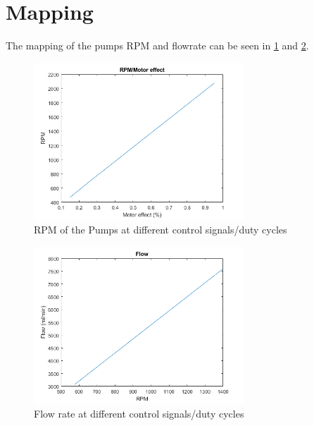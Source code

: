  
 



 













\section{Mapping}
The mapping of the pumps RPM and flowrate can be seen in \ref{fig:RPM} and \ref{fig:Flowrate}.
\begin{figure}[h]
    \centering
    \includegraphics[width=0.7\textwidth]{RPM.png}
    \caption{RPM of the Pumps at different control signals/duty cycles}
    \label{fig:RPM}
\end{figure}


\begin{figure}[h]
    \centering
    \includegraphics[width=0.7\textwidth]{Flow.png}
    \caption{Flow rate at different control signals/duty cycles}
    \label{fig:Flowrate}
\end{figure}


